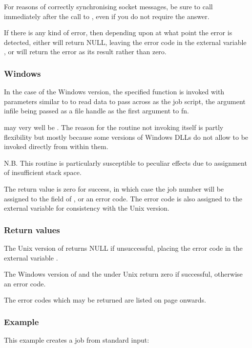 For reasons of correctly synchronising socket messages, be sure to call \funcXBjobres{} immediately after the call to
, even if you do not require the answer.

If there is any kind of error, then depending upon at what point the error is detected, either \funcXBjobadd{} will return
NULL, leaving the error code in the external variable \filename{\errorloc}, or \funcXBjobres{} will return the error as its result
rather than zero.

\subsubsection{Windows}
In the case of the Windows version, the specified function  is invoked with parameters similar to
 to read data to pass across as the job script, the argument infile being passed as a file handle as the first
argument to fn.

 may very well be . The reason for the routine not invoking 
itself is partly flexibility but mostly because some versions of Windows DLLs do not allow  to be invoked
directly from within them.

N.B. This routine is particularly susceptible to peculiar effects due to assignment of insufficient stack space.

The return value is zero for success, in which case the job number will be assigned to the  field of
, or an error code. The error code is also assigned to the external variable \filename{\errorloc}
for consistency with the Unix version.

\subsubsection{Return values}
The Unix version of \funcXBjobadd{} returns NULL if unsuccessful, placing the error code in the external variable
\filename{\errorloc}.

The Windows version of \funcXBjobadd{} and the \funcXBjobres{} under Unix return zero if successful, otherwise an error code.

The error codes which may be returned are listed on page \pageref{errorcodes} onwards.

\subsubsection{Example}
This example creates a job from standard input:

